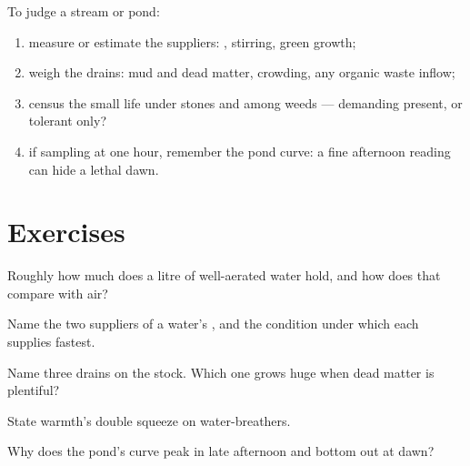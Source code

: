 \begin{method}\label{met:g7:oxygen-in-the-water:judge}
To judge a stream or pond:
\begin{enumerate}
  \item measure or estimate the suppliers: ,
        stirring, green growth;
  \item weigh the drains: mud and dead matter, crowding,
        any organic waste inflow;
  \item census the small life under stones and among weeds
        --- demanding  present, or tolerant only?
  \item if sampling at one hour, remember the pond curve:
        a fine afternoon reading can hide a lethal dawn.
\end{enumerate}
\end{method}

\section{Exercises}

\begin{exercise}[$\star$]\label{exo:g7:oxygen-in-the-water:1}
Roughly how much  does a litre of well-aerated water
hold, and how does that compare with air?
\end{exercise}

\begin{exercise}[$\star$]\label{exo:g7:oxygen-in-the-water:2}
Name the two suppliers of a water's , and the
condition under which each supplies fastest.
\end{exercise}

\begin{exercise}[$\star$]\label{exo:g7:oxygen-in-the-water:3}
Name three drains on the stock. Which one grows huge when
dead matter is plentiful?
\end{exercise}

\begin{exercise}[$\star$]\label{exo:g7:oxygen-in-the-water:4}
State warmth's double squeeze on water-breathers.
\end{exercise}

\begin{exercise}[$\star$]\label{exo:g7:oxygen-in-the-water:5}
Why does the pond's  curve peak in late afternoon
and bottom out at dawn?
\end{exercise}

